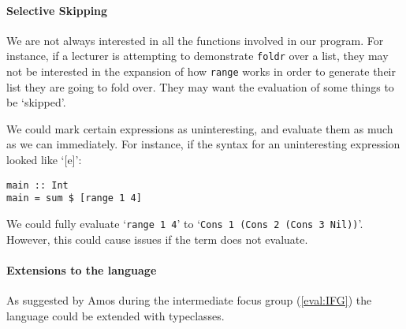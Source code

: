 \paragraph{Selective Skipping}
\label{fw:function_checkboxes}
We are not always interested in all the functions involved in our program. For instance, if a lecturer is attempting to demonstrate \verb|foldr| over a list, they may not be interested in the expansion of how \verb|range| works in order to generate their list they are going to fold over. They may want the evaluation of some things to be `skipped'. 

We could mark certain expressions as uninteresting, and evaluate them as much as we can immediately. For instance, if the syntax for an uninteresting expression looked like `[e]':

\begin{lstlisting}[language=SFL]
main :: Int 
main = sum $ [range 1 4]
\end{lstlisting}

\noindent We could fully evaluate `\lstinline[language=SFL]|range 1 4|' to `\lstinline[language=SFL]|Cons 1 (Cons 2 (Cons 3 Nil))|'. However, this could cause issues if the term does not evaluate. 







\paragraph{Extensions to the language}
As suggested by Amos during the intermediate focus group (\ref{eval:IFG}) the language could be extended with typeclasses. 
